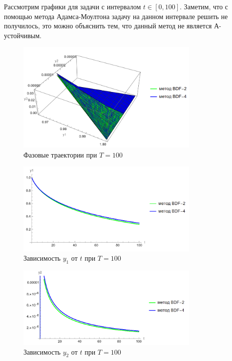 \documentclass[12pt, a4paper]{article}
\begin{document}
\newpage
Рассмотрим графики для задачи с интервалом $t \in [0, 100]$. Заметим, что с помощью метода Адамса-Моултона задачу на данном интервале решить не получилось, это можно объяснить тем, что данный метод не является А-устойчивым.

\begin{figure}[!htbp]
	\centering
	\includegraphics[width=0.8\textwidth]{T100-0}%
	\caption{Фазовые траектории при $T = 100$}
	\vspace*{-2mm}
	\label{T100-0}
\end{figure}
\begin{figure}[!htbp]
	\centering
	\includegraphics[width=0.8\textwidth]{T100-1}%
	\caption{Зависимость $y_1$ от $t$ при $T = 100$}
	\vspace*{-2mm}
	\label{T100-1}
\end{figure}
\begin{figure}[!htbp]
	\centering
	\includegraphics[width=0.8\textwidth]{T100-2}%
	\caption{Зависимость $y_2$ от $t$ при $T = 100$}
	\vspace*{-2mm}
	\label{T100-2}
\end{figure}
\end{document}
